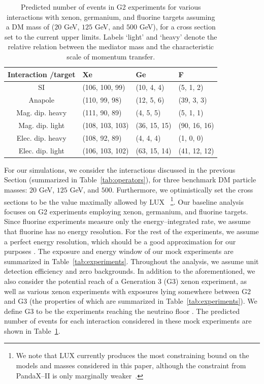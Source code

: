 \documentclass[11pt, a4paper]{article}
\begin{document}
\begin{table}[t] 
\setlength{\extrarowheight}{3pt}
\setlength{\tabcolsep}{12pt}
\begin{center}
\begin{tabular}{|c||m{3cm}|m{3cm}|m{3cm}|}\hline
Interaction /target & Xe & Ge & F\\
\hline\hline 
SI& (106, 100, 99)& (10, 4, 4)& (5, 1, 2)\\ \hline
Anapole& (110, 99, 98)& (12, 5, 6)& (39, 3, 3)\\ \hline
Mag. dip. heavy& (111, 90, 89)& (4, 5, 5)& (5, 1, 1)\\ \hline
Mag. dip. light& (108, 103, 103)& (36, 15, 15)& (90, 16, 16)\\ \hline
Elec. dip. heavy& (108, 92, 89)& (4, 4, 4)& (1, 0, 0)\\ \hline
Elec. dip. light& (106, 103, 102)& (63, 15, 14)& (41, 12, 12)\\ \hline

\end{tabular}
\end{center}
\caption{Predicted number of events in G2 experiments for various interactions with xenon, germanium, and fluorine targets assuming a DM mass of ($20$ GeV, $125$ GeV, and $500$ GeV), for a cross section set to the current upper limits. Labels `light' and `heavy' denote the relative relation between the mediator mass and the characteristic scale of momentum transfer. }
\label{tab:pred_events}
\end{table}

For our simulations, we consider the interactions discussed in the previous Section (summarized in Table~\ref{tab:operators}), for three benchmark DM particle masses: $20$ GeV, $125$ GeV, and $500$. Furthermore, we optimistically set the cross sections to be the value maximally allowed by LUX~\cite{Akerib:2016vxi} \footnote{We note that LUX currently produces the most constraining bound on the models and masses considered in this paper, although the constraint from PandaX--II is only marginally weaker~\cite{Tan:2016zwf}.}. Our baseline analysis focuses on G2 experiments employing xenon, germanium, and fluorine targets. Since fluorine experiments measure only the energy--integrated rate, we assume that fluorine has no energy resolution. For the rest of the experiments, we assume a perfect energy resolution, which should be a good approximation for our purposes \cite{Gluscevic:2015sqa}. The exposure and energy window of our mock experiments are summarized in Table~\ref{tab:experiments}. Throughout the analysis, we assume unit detection efficiency and zero backgrounds. In addition to the aforementioned, we also consider the potential reach of a Generation 3 (G3) xenon experiment, as well as various xenon experiments with exposures lying somewhere between G2 and G3 (the properties of which are summarized in Table~\ref{tab:experiments}).  We define G3 to be the experiments reaching the neutrino floor \cite{Billard:2013qya}. The predicted number of events for each interaction considered in these mock experiments are shown in Table~\ref{tab:pred_events}. 
\end{document}
